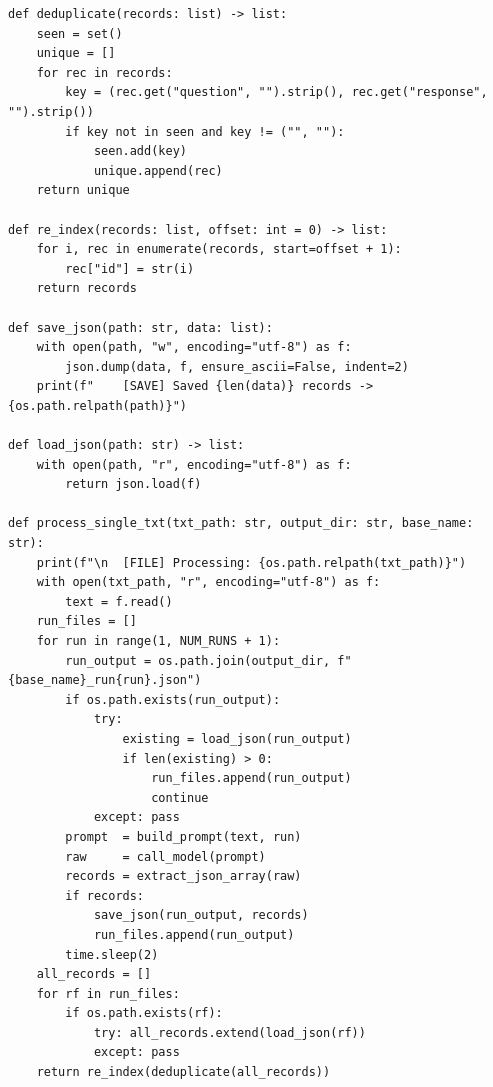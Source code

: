\documentclass[11pt]{article}
\begin{document}
\begin{lstlisting}[style=pythonstyle, caption={generate\_dataset\_first.py}]
def deduplicate(records: list) -> list:
    seen = set()
    unique = []
    for rec in records:
        key = (rec.get("question", "").strip(), rec.get("response", "").strip())
        if key not in seen and key != ("", ""):
            seen.add(key)
            unique.append(rec)
    return unique

def re_index(records: list, offset: int = 0) -> list:
    for i, rec in enumerate(records, start=offset + 1):
        rec["id"] = str(i)
    return records

def save_json(path: str, data: list):
    with open(path, "w", encoding="utf-8") as f:
        json.dump(data, f, ensure_ascii=False, indent=2)
    print(f"    [SAVE] Saved {len(data)} records -> {os.path.relpath(path)}")

def load_json(path: str) -> list:
    with open(path, "r", encoding="utf-8") as f:
        return json.load(f)

def process_single_txt(txt_path: str, output_dir: str, base_name: str):
    print(f"\n  [FILE] Processing: {os.path.relpath(txt_path)}")
    with open(txt_path, "r", encoding="utf-8") as f:
        text = f.read()
    run_files = []
    for run in range(1, NUM_RUNS + 1):
        run_output = os.path.join(output_dir, f"{base_name}_run{run}.json")
        if os.path.exists(run_output):
            try:
                existing = load_json(run_output)
                if len(existing) > 0:
                    run_files.append(run_output)
                    continue
            except: pass
        prompt  = build_prompt(text, run)
        raw     = call_model(prompt)
        records = extract_json_array(raw)
        if records:
            save_json(run_output, records)
            run_files.append(run_output)
        time.sleep(2)
    all_records = []
    for rf in run_files:
        if os.path.exists(rf):
            try: all_records.extend(load_json(rf))
            except: pass
    return re_index(deduplicate(all_records))


\end{lstlisting}
\end{document}
